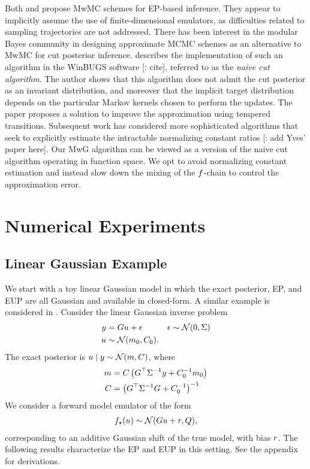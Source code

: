 \documentclass[12pt]{article}
\begin{document}
Both \citep{garegnani2021NoisyMCMC} and \citet{BurknerSurrogate} propose MwMC schemes
for EP-based inference. They appear to implicitly assume the use of finite-dimensional emulators,
as difficulties related to sampling trajectories are not addressed. There has been interest in the 
modular Bayes community in designing approximate MCMC schemes as an alternative to
MwMC for cut posterior inference. \citet{PlummerCut} describes the implementation of such 
an algorithm in the WinBUGS software [\todo: cite], referred to as the \textit{naive cut algorithm}.
The author shows that this algorithm does not admit the cut posterior as an invariant
distribution, and moreover that the implicit target distribution depends on the particular Markov kernels
chosen to perform the updates. The paper proposes a solution to improve the approximation 
using tempered transitions. Subsequent work has considered more sophisticated algorithms
that seek to explicitly estimate the intractable normalizing constant ratios
\citep{SAACut} [\todo: add Yves' paper here]. 
Our MwG algorithm can be viewed as a version of the naive cut algorithm operating in function space.
We opt to avoid normalizing constant estimation and instead slow down the mixing of the 
$f$-chain to control the approximation error.

\section{Numerical Experiments} \label{sec:experiments}

\subsection{Linear Gaussian Example}
We start with a toy linear Gaussian model in which the exact posterior, EP, and EUP are all 
Gaussian and available in closed-form. A similar example is considered in
\citet{garegnani2021NoisyMCMC}.
Consider the linear Gaussian inverse problem
\begin{align}
y &= G u + \epsilon
&&\epsilon \sim \mathcal{N}(0, \Sigma) \label{eq:lin-Gauss-inv-prob} \\
u &\sim \mathcal{N}(m_0, C_0). \nonumber
\end{align}
The exact posterior is $u \mid y \sim \mathcal{N}(m, C)$, where
\begin{align}
m &= C \left(G^\top \Sigma^{-1}y + C_0^{-1}m_0 \right) \label{eq:lin-Gauss-post-moments} \\
C &= \left(G^\top \Sigma^{-1}G + C_0^{-1} \right)^{-1} \nonumber
\end{align}
We consider a forward model emulator of the form
\begin{align}
{f}_{\star}(u) \sim \mathcal{N}(Gu + r, Q) \label{eq:lin-Gauss-em}, 
\end{align}
corresponding to an additive Gaussian shift of the true model, with bias $r$.
The following results characterize the EP and EUP in this setting. See the appendix for derivations.
\end{document}

